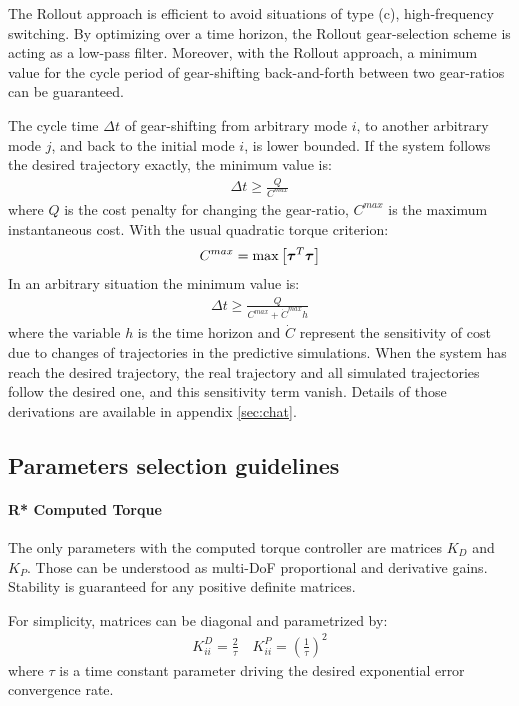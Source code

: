 The Rollout approach is efficient to avoid situations of type (c), high-frequency switching. By optimizing over a time horizon, the Rollout gear-selection scheme is acting as a low-pass filter. Moreover, with the Rollout approach, a minimum value for the cycle period of gear-shifting back-and-forth between two gear-ratios can be guaranteed. 

The cycle time $\Delta t$ of gear-shifting from arbitrary mode $i$, to another arbitrary mode $j$, and back to the initial mode $i$, is lower bounded. If the system follows the desired trajectory exactly, the minimum value is:
%
\begin{align}
\Delta t \geq \frac{Q}{C^{max}}
\label{eq:minshifttime}
\end{align}
%
where $Q$ is the cost penalty for changing the gear-ratio, $C^{max}$ is the maximum instantaneous cost. With the usual quadratic torque criterion:
%
\begin{align}
C^{max} = \operatornamewithlimits{max}\left[ \vec{\tau}^T \vec{\tau} \right]
\end{align}
%
In an arbitrary situation the minimum value is:
%
\begin{align}
\Delta t \geq \frac{ Q }{ C^{max} + \dot{C}^{max} h }
\end{align}
%
where the variable $h$ is the time horizon and $\dot{C}$ represent the sensitivity of cost due to changes of trajectories in the predictive simulations. When the system has reach the desired trajectory, the real trajectory and all simulated trajectories follow the desired one, and this sensitivity term vanish. Details of those derivations are available in appendix \ref{sec:chat}.


\subsection{Parameters selection guidelines}

\paragraph{R* Computed Torque} The only parameters with the computed torque controller are matrices $K_D$ and $K_P$. Those can be understood as multi-DoF proportional and derivative gains. Stability is guaranteed for any positive definite matrices.

For simplicity, matrices can be diagonal and parametrized by:
%
\begin{align}
K^D_{ii} = \frac{2}{\tau} \quad   K^P_{ii} = \left(\frac{1}{\tau}\right)^2
\label{eq:ctctau}
\end{align}
%
where $\tau$ is a time constant parameter driving the desired exponential error convergence rate.

